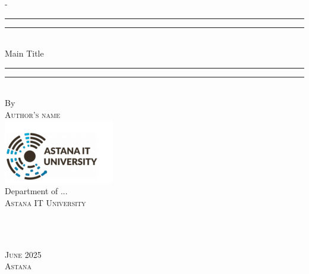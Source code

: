 %
%
\begin{titlingpage}
\begin{SingleSpace}
\calccentering{\unitlength} 
\begin{adjustwidth*}{\unitlength}{-\unitlength}
\vspace*{13mm}
\begin{center}
\rule[0.5ex]{\linewidth}{2pt}\vspace*{-\baselineskip}\vspace*{3.2pt}
\rule[0.5ex]{\linewidth}{1pt}\\[\baselineskip]
{
\linespread{2.0} \selectfont
%
{\HUGE Main Title }\\[4mm]
}

%
\rule[0.5ex]{\linewidth}{1pt}\vspace*{-\baselineskip}\vspace{3.2pt}
\rule[0.5ex]{\linewidth}{2pt}\\
\vspace{6.5mm}
{\large By}\\
\vspace{6.5mm}
{\large\textsc{Author's name}}\\
\vspace{11mm}
\includegraphics[scale=1.2]{logos/AITU.png}\\
\vspace{6mm}
{\large Department of ...\\
\textsc{Astana IT University}}\\
\vspace{30mm}
\begin{minipage}{10cm}
 \\
\end{minipage}\\
\vspace{40mm}
{\large\textsc{June 2025}}\\
{\large\textsc{Astana}}
\vspace{12mm}
\end{center}
\end{adjustwidth*}
\end{SingleSpace}
\end{titlingpage}